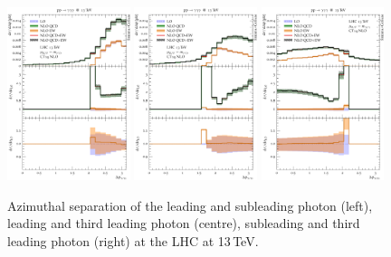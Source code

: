 \begin{figure}[t!]
  \centering
  \includegraphics[width=0.32\textwidth]{figs_aaa/dphi_y1y2}
  \includegraphics[width=0.32\textwidth]{figs_aaa/dphi_y1y3}
  \includegraphics[width=0.32\textwidth]{figs_aaa/dphi_y2y3}
  \caption{
    Azimuthal separation of the leading and subleading photon (left),
    leading and third leading photon (centre), subleading and third leading 
    photon (right) at the LHC at 13\,TeV.\\
    \label{fig:aaa:dphi}
  }
\end{figure}

